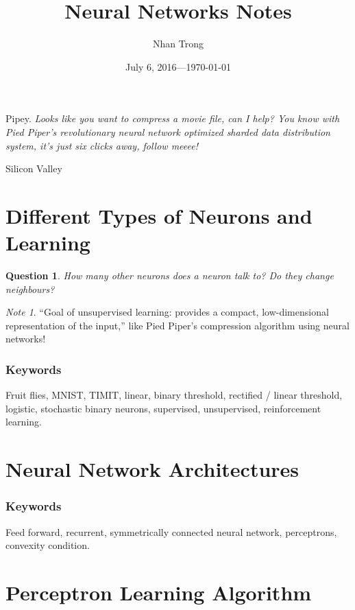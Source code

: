 \documentclass[12pt]{article}
\title{Neural Networks Notes}
\author{Nhan Trong}
\date{July 6, 2016---\today}                                           %
\theoremstyle{plain}
\newtheorem{question}[theorem]{Question}
\theoremstyle{definition}
\theoremstyle{remark}
\newtheorem{note}[theorem]{Note}
\begin{document}
\sloppy
\maketitle

\epigraph{Pipey. \textit{Looks like you want to compress a movie file, can I help? You know with Pied Piper's revolutionary neural network optimized sharded data distribution system, it's just six clicks away, follow meeee!}}{Silicon Valley}

\tableofcontents %

\part{Different Types of Neurons and Learning}

\begin{question}
How many other neurons does a neuron talk to? Do they change neighbours?
\end{question}

\begin{note}
``Goal of unsupervised learning: provides a compact, low-dimensional representation of the input,'' like Pied Piper's compression algorithm using neural networks!
\end{note}

\section*{Keywords}

Fruit flies, MNIST, TIMIT, linear, binary threshold, rectified / linear threshold, logistic, stochastic binary neurons, supervised, unsupervised, reinforcement learning.

\part{Neural Network Architectures}

\section*{Keywords}

Feed forward, recurrent, symmetrically connected neural network, perceptrons, convexity condition.

\part{Perceptron Learning Algorithm}
\end{document}
